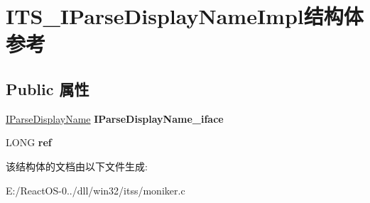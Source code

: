 \hypertarget{struct_i_t_s___i_parse_display_name_impl}{}\section{I\+T\+S\+\_\+\+I\+Parse\+Display\+Name\+Impl结构体 参考}
\label{struct_i_t_s___i_parse_display_name_impl}
\subsection*{Public 属性}
\begin{DoxyCompactItemize}
\item 
\mbox{\label{struct_i_t_s___i_parse_display_name_impl_aa7ae318ed32ad972b3028b08d96aae21}} 
\hyperlink{interface_i_parse_display_name}{I\+Parse\+Display\+Name} {\bfseries I\+Parse\+Display\+Name\+\_\+iface}
\item 
\mbox{\label{struct_i_t_s___i_parse_display_name_impl_ae84d9b9a24f92daf103d29502ad45494}} 
L\+O\+NG {\bfseries ref}
\end{DoxyCompactItemize}


该结构体的文档由以下文件生成\+:\begin{DoxyCompactItemize}
\item 
E\+:/\+React\+O\+S-\/0../dll/win32/itss/moniker.\+c\end{DoxyCompactItemize}
